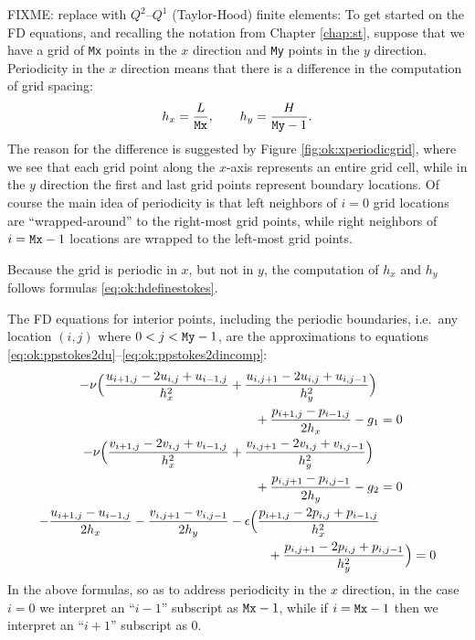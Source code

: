 FIXME: replace with $Q^2$--$Q^1$ (Taylor-Hood) finite elements:  To get started on the FD equations, and recalling the notation from Chapter \ref{chap:st}, suppose that we have a grid of \texttt{Mx} points in the $x$ direction and \texttt{My} points in the $y$ direction.  Periodicity in the $x$ direction means that there is a difference in the computation of grid spacing:
\begin{equation}
h_x = \frac{L}{\text{\texttt{Mx}}}, \qquad h_y = \frac{H}{\text{\texttt{My}}-1}. \label{eq:ok:hdefinestokes}
\end{equation}
The reason for the difference is suggested by Figure \ref{fig:ok:xperiodicgrid}, where we see that each grid point along the $x$-axis represents an entire grid cell, while in the $y$ direction the first and last grid points represent boundary locations.  Of course the main idea of periodicity is that left neighbors of $i=0$ grid locations are ``wrapped-around'' to the right-most grid points, while right neighbors of $i=\text{\texttt{Mx}}-1$ locations are wrapped to the left-most grid points.

\begin{marginfigure}

\caption{Because the grid is periodic in $x$, but not in $y$, the computation of $h_x$ and $h_y$ follows formulas \eqref{eq:ok:hdefinestokes}.}
\label{fig:ok:xperiodicgrid}
\end{marginfigure}

The FD equations for interior points, including the periodic boundaries, i.e.~any location $(i,j)$ where $0 < j < \text{\texttt{My}}-1$, are the approximations to equations \eqref{eq:ok:ppstokes2du}--\eqref{eq:ok:ppstokes2dincomp}:
\begin{align}
-\nu \Big(\frac{u_{i+1,j} - 2 u_{i,j} + u_{i-1,j}}{h_x^2} &+ \frac{u_{i,j+1} - 2 u_{i,j} + u_{i,j-1}}{h_y^2}\Big) \notag \\
&\qquad + \frac{p_{i+1,j}-p_{i-1,j}}{2h_x} - g_1 = 0 \label{eq:ok:fdstokes2du} \\
-\nu \Big(\frac{v_{i+1,j} - 2 v_{i,j} + v_{i-1,j}}{h_x^2} &+ \frac{v_{i,j+1} - 2 v_{i,j} + v_{i,j-1}}{h_y^2}\Big) \notag \\
&\qquad + \frac{p_{i,j+1}-p_{i,j-1}}{2h_y} - g_2 = 0 \label{eq:ok:fdstokes2dv} \\
- \frac{u_{i+1,j}-u_{i-1,j}}{2h_x} - \frac{v_{i,j+1}-v_{i,j-1}}{2h_y} &- \epsilon \Big(\frac{p_{i+1,j} - 2 p_{i,j} + p_{i-1,j}}{h_x^2} \notag \\
&\qquad\quad + \frac{p_{i,j+1} - 2 p_{i,j} + p_{i,j-1}}{h_y^2}\Big) = 0 \label{eq:ok:fdstokes2dincomp}
\end{align}
In the above formulas, so as to address periodicity in the $x$ direction, in the case $i=0$ we interpret an ``$i-1$'' subscript as $\text{\texttt{Mx}}-1$, while if $i=\text{\texttt{Mx}}-1$ then we interpret an ``$i+1$'' subscript as $0$.

